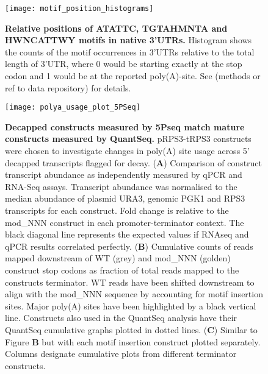 \documentclass[../main.tex]{subfiles}
\begin{document}
\begin{figure}[ph!]

{\centering \texttt{[image: motif\_position\_histograms]} 

}

\caption[Relative positions of ATATTC, TGTAHMNTA and HWNCATTWY motifs in native 3'UTRs.]{\textbf{Relative positions of ATATTC, TGTAHMNTA and HWNCATTWY motifs in native 3'UTRs.} Histogram shows the counts of the motif occurrences in 3'UTRs relative to the total length of 3'UTR, where 0 would be starting exactly at the stop codon and 1 would be at the reported poly(A)-site. See (methods or ref to data repository) for details.}\label{fig:motif-position-histograms}
\end{figure}

\begin{figure}[ph!]

{\centering \texttt{[image: polya\_usage\_plot\_5PSeq]} 

}

\caption[Decapped constructs measured by 5Pseq match mature constructs measured by QuantSeq.]{\textbf{Decapped constructs measured by 5Pseq match mature constructs measured by QuantSeq.} pRPS3-tRPS3 constructs were chosen to investigate changes in poly(A) site usage across 5' decapped transcripts flagged for decay. (\textbf{A}) Comparison of construct transcript abundance as independently measured by qPCR and RNA-Seq assays. Transcript abundance was normalised to the median abundance of  plasmid URA3, genomic PGK1 and RPS3 transcripts for each construct. Fold change is relative to the mod\_NNN construct in each promoter-terminator context. The black diagonal line represents the expected values if RNAseq and qPCR results correlated perfectly. (\textbf{B}) Cumulative counts of reads mapped downstream of WT (grey) and mod\_NNN (golden) construct stop codons as fraction of total reads mapped to the constructs terminator. WT reads have been shifted downstream to align with the mod\_NNN sequence by accounting for motif insertion sites. Major poly(A) sites have been highlighted by a black vertical line. Constructs also used in the QuantSeq analysis have their QuantSeq cumulative graphs plotted in dotted lines. (\textbf{C}) Similar to Figure \textbf{B} but with each motif insertion construct plotted separately. Columns designate cumulative plots from different terminator constructs.}\label{fig:polyA-site-usage-5Pseq}
\end{figure}
\end{document}
